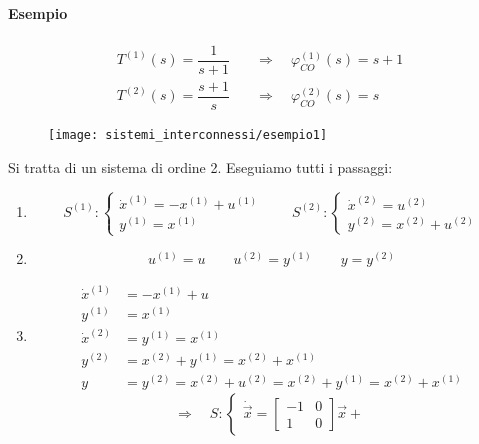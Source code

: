 \documentclass[../main.tex]{subfiles}
\begin{document}
		\begin{mdframed}[style=Esempio]
			\paragraph{Esempio}
				\[
					\begin{aligned}
						T^{(1)}(s) = \dfrac{1}{s+1}
						&\quad\Rightarrow\quad
						\varphi_{CO}^{(1)}(s) = s+1
						\\
						T^{(2)}(s) = \dfrac{s+1}{s}
						&\quad\Rightarrow\quad
						\varphi_{CO}^{(2)}(s) = s
					\end{aligned}
				\]
				\begin{figure}[H]
					\centering\texttt{[image: sistemi\_interconnessi/esempio1]}
				\end{figure}
				Si tratta di un sistema di ordine 2. Eseguiamo tutti i passaggi:
				\begin{enumerate}
					\item 
						\[
							S^{(1)}:
							\begin{cases}
								\dot x^{(1)} = -x^{(1)} + u^{(1)}\\
								y^{(1)} = x^{(1)}
							\end{cases}
							\qquad
							S^{(2)}:
							\begin{cases}
								\dot x^{(2)} = u^{(2)}\\
								y^{(2)} = x^{(2)} + u^{(2)}
							\end{cases}
						\]
					\item 
						\[
							u^{(1)} = u \qquad u^{(2)} = y^{(1)} \qquad y = y^{(2)}
						\]
					\item 
						\[
							\begin{aligned}
								\dot x^{(1)} &= -x^{(1)} + u\\
								y^{(1)} &= x^{(1)}\\
								\dot x^{(2)} &= y^{(1)} = x^{(1)}\\
								y^{(2)} &= x^{(2)} + y^{(1)} = x^{(2)} + x^{(1)}\\
								y &= y^{(2)} = x^{(2)} + u^{(2)} = x^{(2)} + y^{(1)} = x^{(2)} + x^{(1)}
							\end{aligned}
						\]
						\[
							\Rightarrow\quad S:
							\begin{cases}
								\dot{\vec x} =
								\begin{bmatrix}
									-1 & 0\\
									1 & 0
								\end{bmatrix} \vec x +

\end{cases}\]
\end{enumerate}
\end{mdframed}
\end{document}
